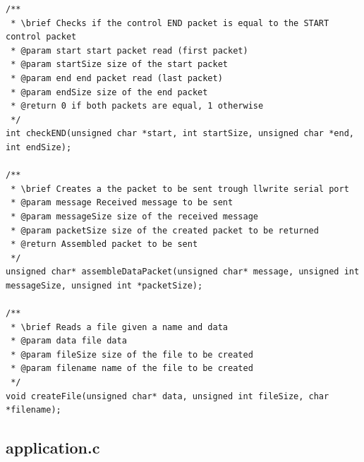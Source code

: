 \documentclass[11pt]{article}
\begin{document}
\begin{lstlisting}[style=CStyle]
/**
 * \brief Checks if the control END packet is equal to the START control packet
 * @param start start packet read (first packet)
 * @param startSize size of the start packet
 * @param end end packet read (last packet)
 * @param endSize size of the end packet
 * @return 0 if both packets are equal, 1 otherwise
 */
int checkEND(unsigned char *start, int startSize, unsigned char *end, int endSize);

/**
 * \brief Creates a the packet to be sent trough llwrite serial port
 * @param message Received message to be sent
 * @param messageSize size of the received message
 * @param packetSize size of the created packet to be returned
 * @return Assembled packet to be sent
 */
unsigned char* assembleDataPacket(unsigned char* message, unsigned int messageSize, unsigned int *packetSize);

/**
 * \brief Reads a file given a name and data
 * @param data file data
 * @param fileSize size of the file to be created
 * @param filename name of the file to be created
 */
void createFile(unsigned char* data, unsigned int fileSize, char *filename);
\end{lstlisting}

\pagebreak

\subsection{application.c}
\end{document}
